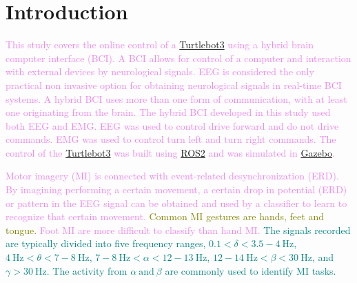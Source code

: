 \section{Introduction}
\label{section:intro}

\textcolor{violet}{This study covers the online control of a \href{https://github.com/ROBOTIS-GIT/turtlebot3}{Turtlebot3} using a hybrid brain computer interface (BCI). A BCI allows for control of a computer and interaction with external devices by neurological signals\:\cite{lotteReviewClassificationAlgorithms2018}\cite{fouadBrainComputerInterface2015}. EEG is considered the only practical non invasive option for obtaining neurological signals in real-time BCI systems\:\cite{fouadBrainComputerInterface2015}. A hybrid BCI uses more than one form of communication, with at least one originating from the brain\:\cite{leebHybridBrainComputer2011}\cite{hongHybridBrainComputer2017}. The hybrid BCI developed in this study used both EEG and EMG. EEG was used to control drive forward and do not drive commands. EMG was used to control turn left and turn right commands. The control of the \href{https://github.com/ROBOTIS-GIT/turtlebot3}{Turtlebot3} was built using \href{https://docs.ros.org/en/humble/index.html}{ROS2} and was simulated in \href{https://gazebosim.org/home}{Gazebo}.}


\textcolor{violet}{Motor imagery (MI) is connected with event-related desynchronization (ERD)\:\cite{gordleevaRealTimeEEGEMG2020}. By imagining performing a certain movement, a certain drop in potential (ERD) or pattern in the EEG signal can be obtained and used by a classifier to learn to recognize that certain movement\:\cite{gordleevaRealTimeEEGEMG2020}\cite{blankertzOptimizingSpatialFilters2008}.}
\textcolor{olive}{Common MI gestures are hands, feet and tongue\:\cite{tangSpatialFilterTemporal2024}.}
\textcolor{violet}{Foot MI are more difficult to classify than hand MI\:\cite{gordleevaRealTimeEEGEMG2020}.}
\textcolor{teal}{The signals recorded are typically divided into five frequency ranges, $0.1<\delta<3.5-4\:\text{Hz}$, $4\:\text{Hz}<\theta<7-8\:\text{Hz}$, $7-8\:\text{Hz}<\alpha<12-13\:\text{Hz}$, $12-14\:\text{Hz}<\beta<30\:\text{Hz}$, and $\gamma > 30\:\text{Hz}$\:\textcolor{violet}{\cite{khoslaComparativeAnalysisSignal2020}\cite{minguillonTrendsEEGBCIDailylife2017}\cite{mannanIdentificationRemovalPhysiological2018}}\cite{padfieldEEGBasedBrainComputerInterfaces2019}.}
\textcolor{teal}{The activity from $\alpha \: \text{and} \: \beta$ are commonly used to identify MI tasks\:\cite{padfieldEEGBasedBrainComputerInterfaces2019}\cite{liHybridBrainMuscle2019}.}

